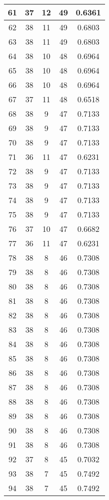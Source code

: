\documentclass[letterpaper, 12pt]{article}
\begin{document}
\begin{longtable}{|c|c|c|c|c|}
\hline
61 & 37 & 12 & 49 & 0.6361 \\
\hline
62 & 38 & 11 & 49 & 0.6803 \\
\hline
63 & 38 & 11 & 49 & 0.6803 \\
\hline
64 & 38 & 10 & 48 & 0.6964 \\
\hline
65 & 38 & 10 & 48 & 0.6964 \\
\hline
66 & 38 & 10 & 48 & 0.6964 \\
\hline
67 & 37 & 11 & 48 & 0.6518 \\
\hline
68 & 38 & 9 & 47 & 0.7133 \\
\hline
69 & 38 & 9 & 47 & 0.7133 \\
\hline
70 & 38 & 9 & 47 & 0.7133 \\
\hline
71 & 36 & 11 & 47 & 0.6231 \\
\hline
72 & 38 & 9 & 47 & 0.7133 \\
\hline
73 & 38 & 9 & 47 & 0.7133 \\
\hline
74 & 38 & 9 & 47 & 0.7133 \\
\hline
75 & 38 & 9 & 47 & 0.7133 \\
\hline
76 & 37 & 10 & 47 & 0.6682 \\
\hline
77 & 36 & 11 & 47 & 0.6231 \\
\hline
78 & 38 & 8 & 46 & 0.7308 \\
\hline
79 & 38 & 8 & 46 & 0.7308 \\
\hline
80 & 38 & 8 & 46 & 0.7308 \\
\hline
81 & 38 & 8 & 46 & 0.7308 \\
\hline
82 & 38 & 8 & 46 & 0.7308 \\
\hline
83 & 38 & 8 & 46 & 0.7308 \\
\hline
84 & 38 & 8 & 46 & 0.7308 \\
\hline
85 & 38 & 8 & 46 & 0.7308 \\
\hline
86 & 38 & 8 & 46 & 0.7308 \\
\hline
87 & 38 & 8 & 46 & 0.7308 \\
\hline
88 & 38 & 8 & 46 & 0.7308 \\
\hline
89 & 38 & 8 & 46 & 0.7308 \\
\hline
90 & 38 & 8 & 46 & 0.7308 \\
\hline
91 & 38 & 8 & 46 & 0.7308 \\
\hline
92 & 37 & 8 & 45 & 0.7032 \\
\hline
93 & 38 & 7 & 45 & 0.7492 \\
\hline
94 & 38 & 7 & 45 & 0.7492 \\
\hline

\end{longtable}
\end{document}
